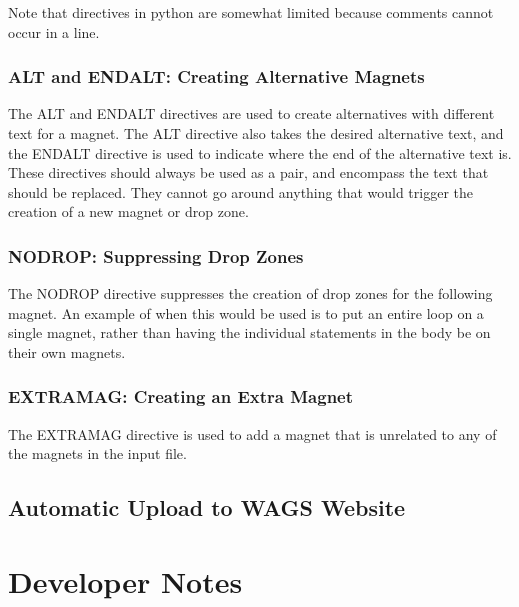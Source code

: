 \documentclass[letter,10pt]{article}
\begin{document}
Note that directives in python are somewhat limited because comments 
cannot occur in a line. 

\subsubsection{ALT and ENDALT: Creating Alternative Magnets}

The ALT and ENDALT directives are used to create alternatives with 
different text for a magnet. The ALT directive also takes the desired 
alternative text, and the ENDALT directive is used to indicate where 
the end of the alternative text is. These directives should always be 
used as a pair, and encompass the text that should be replaced. They 
cannot go around anything that would trigger the creation of a new 
magnet or drop zone.


\subsubsection{NODROP: Suppressing Drop Zones}

The NODROP directive suppresses the creation of drop zones for the 
following magnet. An example of when this would be used is to put an 
entire loop on a single magnet, rather than having the individual 
statements in the body be on their own magnets.


\subsubsection{EXTRAMAG: Creating an Extra Magnet}

The EXTRAMAG directive is used to add a magnet that is unrelated to any 
of the magnets in the input file. 



\subsection{Automatic Upload to WAGS Website}

\section{Developer Notes}
\end{document}
